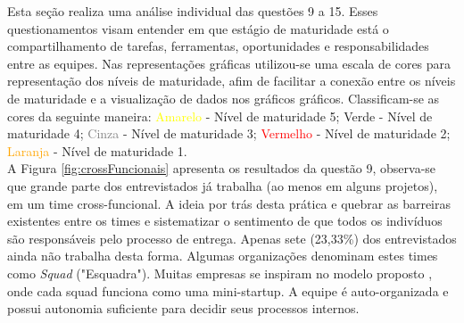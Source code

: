 \documentclass[twoside,english,brazilian]{UNISINOSartigo}
\begin{document}
Esta seção realiza uma análise individual das questões 9 a 15. Esses questionamentos visam entender em que estágio de maturidade está o compartilhamento de tarefas, ferramentas, oportunidades e responsabilidades entre as equipes. Nas representações gráficas utilizou-se uma escala de cores para representação dos níveis de maturidade, afim de facilitar a conexão entre os níveis de maturidade e a visualização de dados nos gráficos gráficos. Classificam-se as cores da seguinte maneira: {\textcolor{yellow}{Amarelo}} - Nível de maturidade 5; \textcolor{persiangreen}{Verde} - Nível de maturidade 4; \textcolor{gray}{Cinza} - Nível de maturidade 3; \textcolor{red}{Vermelho} - Nível de maturidade 2; \textcolor{orange}{Laranja} - Nível de maturidade 1.\\ \indent
 A Figura \ref{fig:crossFuncionais} apresenta os resultados da questão 9, observa-se que grande parte dos entrevistados já trabalha (ao menos em alguns projetos), em um time cross-funcional. A ideia por trás desta prática e quebrar as barreiras existentes entre os times e sistematizar o sentimento de que todos os indivíduos são responsáveis pelo processo de entrega.
Apenas sete (23,33\%) dos entrevistados ainda não trabalha desta forma. 
Algumas organizações denominam estes times como \textit{Squad} ("Esquadra"). Muitas empresas se inspiram no modelo proposto , onde cada squad funciona como uma mini-startup. A equipe é auto-organizada e possui autonomia suficiente para decidir seus processos internos.
\end{document}
